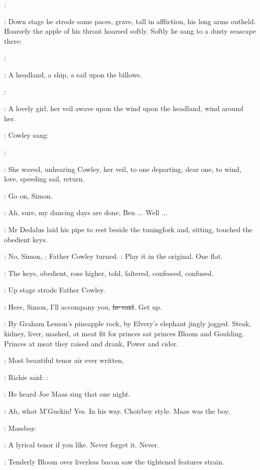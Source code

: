 \cowley:

:
Down stage he strode some paces,
grave,
tall in affliction,
his long
arms outheld.
Hoarsely the apple of his throat hoarsed softly.
Softly he
sang to a dusty seascape there:

\simon:

:
A headland,
a ship,
a
sail upon the billows.

\simon:

:
A lovely girl,
her veil awave upon the
wind upon the headland,
wind around her.

:
Cowley sang:

\cowley:

:
She waved,
unhearing Cowley,
her veil,
to one departing,
dear one,
to
wind,
love,
speeding sail,
return.

\dollard:
Go on,
Simon.

\simon:
Ah,
sure,
my dancing days are done,
Ben ...
Well ...

:
Mr Dedalus laid his pipe to rest beside the tuningfork
and,
sitting,
touched the obedient keys.

\cowley:
No,
Simon,
:
Father Cowley turned.
\cowley:
Play it in the original.
One flat.

:
The keys,
obedient,
rose higher,
told,
faltered,
confessed,
confused.

:
Up stage strode Father Cowley.

\cowley:
Here,
Simon,
I'll accompany you,
\sout{he said}.
Get up.

:
By Graham Lemon's pineapple rock,
by Elvery's elephant jingly
jogged.
Steak,
kidney,
liver,
mashed,
at meat fit for princes sat princes
Bloom and Goulding.
Princes at meat they raised and drank,
Power and
cider.

\goulding:
Most beautiful tenor air ever written,

:
Richie said:
\goulding:

:
He heard Joe Maas sing that one night.

\goulding:
Ah,
what M'Guckin!
Yes.
In his way.
Choirboy style.
Maas was the boy.

\BloomInt:
Massboy.

\goulding:
A lyrical tenor if you like.
Never forget it.
Never.

:
Tenderly Bloom over liverless bacon saw
the tightened features strain.

